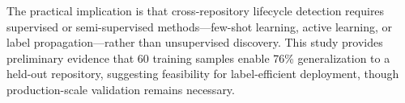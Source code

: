 The practical implication is that cross-repository lifecycle detection requires supervised or semi-supervised methods---few-shot learning, active learning, or label propagation---rather than unsupervised discovery. This study provides preliminary evidence that 60 training samples enable 76\% generalization to a held-out repository, suggesting feasibility for label-efficient deployment, though production-scale validation remains necessary.


